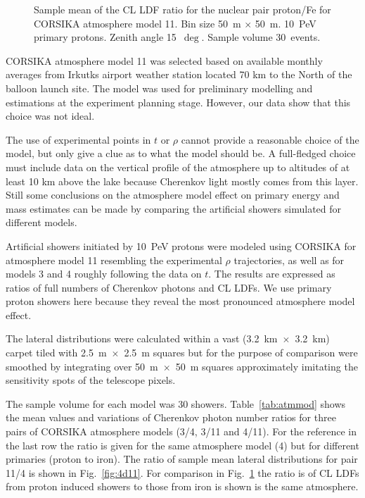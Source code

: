 \documentclass[preprint,5p,times]{elsarticle}
\begin{document}
\begin{figure}[tb]
\begin{minipage}[t]{0.48\textwidth}
    \vspace{-1.0pc}
    \caption{Sample mean of the CL LDF ratio for the nuclear pair proton/Fe for CORSIKA atmosphere model 11. Bin size 50~m $\times$ 50~m. 10~PeV primary protons. Zenith angle 15~$\deg$. Sample volume 30~events.}
\label{fig:pdFe}
\end{minipage}
\end{figure}


CORSIKA atmosphere model 11 was selected based on available monthly averages from Irkutks airport weather station located 70 km to the North of the balloon launch site. The model was used for preliminary modelling and estimations at the experiment planning stage. However, our data show that this choice was not ideal.

The use of experimental points in $t$ or $\rho$ cannot provide a reasonable choice of the model, but only give a clue as to what the model should be. A full-fledged choice must include data on the vertical profile of the atmosphere up to altitudes of at least 10 km above the lake because Cherenkov light mostly comes from this layer. Still some conclusions on the atmosphere model effect on primary energy and mass estimates can be made by comparing the artificial showers simulated for different models.

Artificial showers initiated by 10~PeV protons were modeled using CORSIKA for atmosphere model 11 resembling the experimental $\rho$ trajectories, as well as for models 3 and 4 roughly following the data on $t$. The results are expressed as ratios of full numbers of Cherenkov photons and CL LDFs. We use primary proton showers here because they reveal the most pronounced atmosphere model effect. 

The lateral distributions were calculated within a vast (3.2~km~$\times$~3.2~km) carpet tiled with 2.5~m~$\times$~2.5~m squares but for the purpose of comparison were smoothed by integrating over 50~m~$\times$~50~m squares approximately imitating the sensitivity spots of the telescope pixels.

The sample volume for each model was 30 showers. Table~\ref{tab:atmmod} shows the mean values and variations of Cherenkov photon number ratios for three pairs of CORSIKA atmosphere models (3/4, 3/11 and 4/11). For the reference in the last row the ratio is given for the same atmosphere model (4) but for different primaries (proton to iron). The ratio of sample mean lateral distributions for pair 11/4 is shown in Fig.~\ref{fig:4d11}. For comparison in Fig.~\ref{fig:pdFe} the ratio is of CL LDFs from proton induced showers to those from iron is shown is the same atmosphere. 
\end{document}
